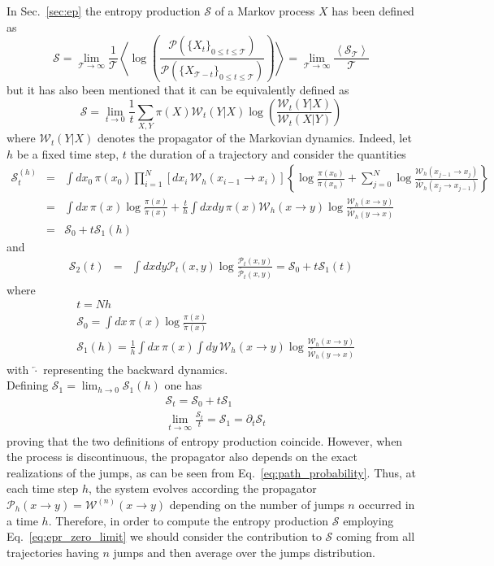 \documentclass[12pt]{iopart}
\newcommand{\lx} {\left}
\newcommand{\rx} {\right}
\newcommand{\ave}[1] {\lx\langle #1 \rx\rangle}
\newcommand{\cP} {\mathcal{P}}
\newcommand{\cW} {\mathcal{W}}
\newcommand{\cS} {\mathcal{S}}
\newcommand{\cT} {\mathcal{T}}
\begin{document}
In Sec.~\ref{sec:ep} the entropy production $\cS$ of a Markov process $X$ has been defined as 
\begin{equation}
    \cS=\lim_{\cT\to\infty}\frac{1}{\cT}\ave{\log\lx(\frac{\cP(\{X_t\}_{0\le t \le \cT})}{\cP(\{ X_{\cT - t}\}_{0 \le t \le \cT})}\rx)}=\lim_{\cT\to\infty} \frac{\ave{\cS_\cT}}{\cT}
\end{equation}
but it has also been mentioned that it can be equivalently defined as 
\begin{equation}
\cS=\lim_{t\to 0} \frac{1}{t}\sum_{X,Y}\pi(X)\cW_t(Y|X)\log\lx(\frac{\cW_t(Y|X)}{\cW_t(X|Y)}\rx)
\label{eq:epr_zero_limit}
\end{equation}
where $\cW_t(Y|X)$ denotes the propagator of the Markovian dynamics.
Indeed, let $h$ be a fixed time step, $t$ the duration of a trajectory and consider the quantities
\begin{eqnarray}
    \cS_t^{(h)} &=& \int dx_0\, \pi(x_0) \prod_{i=1}^N \lx[dx_i\, \cW_h(x_{i-1} \to  x_i) \rx] 
    \lx\{ \log{\frac{\pi(x_0)}{\overleftarrow{\pi}(x_n)}} + \sum_{j=0}^N \log{\frac{\cW_h(x_{j-1} \to  x_j)}{\overleftarrow{\cW_h}(x_j \to  x_{j-1})}}\rx\} \nonumber\\
    &=& \int dx\, \pi(x) \log{\frac{\pi(x)}{\overleftarrow{\pi}(x)}} + \frac{t}{h} \int dxdy\, \pi(x) \cW_h(x\to y) \log{\frac{\cW_h(x \to y)}{\overleftarrow{\cW_h}(y \to  x)}} \nonumber \\
    &=& \cS_0 + t \cS_1(h)
\end{eqnarray}
and 
\begin{eqnarray}    
    \cS_2(t) &=& \int dx dy \cP_t(x,y) \log{\frac{\cP_t(x,y)}{\overleftarrow{\cP_t}(x,y)}} = \cS_0 + t \cS_1(t)
\end{eqnarray}
where
\begin{eqnarray}
    &t = Nh \\
    &\cS_0 = \int dx\, \pi(x) \log{\frac{\pi(x)}{\overleftarrow{\pi}(x)}} \\
    &\cS_1(h) = \frac{1}{h} \int dx \, \pi(x) \int dy \, \cW_h(x\to y) \log{\frac{\cW_h(x\to y)}{\overleftarrow{\cW_h}(y \to x)}}
\end{eqnarray}
with $\overleftarrow{\cdot}$ representing the backward dynamics.\\
Defining $\cS_1 = \lim_{h \to 0} \cS_1(h)$ one has
\begin{eqnarray}
    &\cS_t = \cS_0 + t \cS_1 \\
    &\lim_{t\to\infty} \frac{\cS_t}{t} = \cS_1 = \partial_t \cS_t
\end{eqnarray}
proving that the two definitions of entropy production coincide. However, when the process is discontinuous, the propagator also depends on the exact realizations of the jumps, as can be seen from Eq.~\ref{eq:path_probability}. Thus, at each time step $h$, the system evolves according  the propagator $\cP_h(x \to y)=\cW^{(n)}(x \to y)$ depending on the number of jumps $n$ occurred in a time $h$. Therefore, in order to compute the entropy production $\cS$ employing Eq.~\ref{eq:epr_zero_limit} we should consider the contribution to $\cS$ coming from all trajectories having $n$ jumps and then average over the jumps distribution.\\ 
\end{document}
